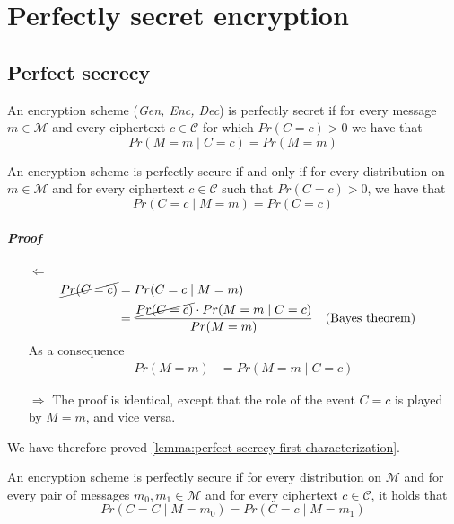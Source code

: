 \documentclass[../main]{subfiles}
\begin{document}
\chapter{Perfectly secret encryption}

\section{Perfect secrecy}

\begin{definition}
    An encryption scheme (\textit{Gen, Enc, Dec}) is perfectly secret if for every message $m \in{} \mathcal{M}$ and every ciphertext $c \in{} \mathcal{C}$ for which $Pr(C=c)>0$ we have that $$Pr(M=m \mid{} C=c) = Pr(M=m)$$
\end{definition}

\begin{lemma}
    \label{lemma:perfect-secrecy-first-characterization}
    An encryption scheme is perfectly secure if and only if for every distribution on $m \in{} \mathcal{M}$ and for every ciphertext $c \in{} \mathcal{C}$ such that $Pr(C=c) > 0$, we have that $$Pr(C=c \mid{} M=m) = Pr(C=c)$$
\end{lemma}

\paragraph{Proof}
    \begin{itemize}
        \item[$\Leftarrow{}$]
            \begin{align*}
                \cancel{Pr(C=c)} &= Pr(C=c \mid M=m) \\
                &= \frac{\cancel{Pr(C=c)} \cdot Pr(M=m \mid C=c)}{Pr(M=m)} &&\text{(Bayes theorem)}
            \end{align*}
            As a consequence
            \begin{align*}
                Pr(M=m) &= Pr(M=m \mid C=c)
            \end{align*}
        \item[$\Rightarrow{}$]
            The proof is identical, except that the role of the event $C=c$ is played by $M=m$, and vice versa.
    \end{itemize}
    We have therefore proved \ref{lemma:perfect-secrecy-first-characterization}.
\begin{lemma}
    \label{lemma:perfect-secrecy-second-characterization}
    An encryption scheme is perfectly secure if for every distribution on $\mathcal{M}$ and for every pair of messages $m_0, m_1 \in{} \mathcal{M}$ and for every ciphertext $c \in{} \mathcal{C}$, it holds that $$Pr(C=C \mid{} M=m_0) = Pr(C=c \mid{} M = m_1)$$
\end{lemma}
\end{document}
